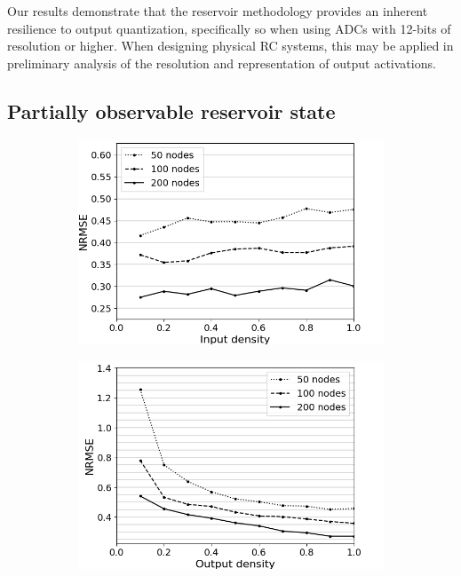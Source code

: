 Our results demonstrate that the reservoir methodology provides an inherent
resilience to output quantization, specifically so when using ADCs with 12-bits
of resolution or higher. When designing physical RC systems, this may be applied
in preliminary analysis of the resolution and representation of output
activations.

\subsection{Partially observable reservoir state}

\begin{figure}[htbp]
  \centering
  \begin{subfigure}{.3\textwidth}
    \centering
    \includegraphics[width=\linewidth]{img/input_density_all.png}
    \caption{}
  \end{subfigure}
  \begin{subfigure}{.3\textwidth}
    \centering
    \includegraphics[width=\linewidth]{img/output_density_all.png}

\end{subfigure}
\end{figure}
